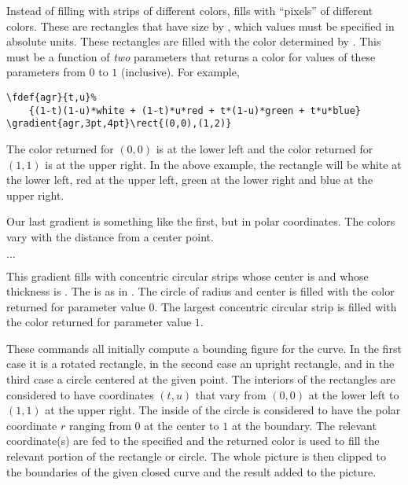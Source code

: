 \documentclass[letterpaper]{article}
\begin{document}
Instead of filling with strips of different colors, 
fills with ``pixels'' of different colors. These are rectangles that
have size  by , which values must be specified
in absolute units. These rectangles are filled with the color determined
by . This must be a function of \emph{two} parameters that
returns a color for values of these parameters from $0$ to $1$
(inclusive). For example,
\begin{verbatim}
\fdef{agr}{t,u}%
    {(1-t)(1-u)*white + (1-t)*u*red + t*(1-u)*green + t*u*blue}
\gradient{agr,3pt,4pt}\rect{(0,0),(1,2)}
\end{verbatim}
The color returned for $(0,0)$ is at the lower left and the color
returned for $(1,1)$ is at the upper right. In the above example, the
rectangle will be white at the lower left, red at the upper left, green
at the lower right and blue at the upper right.

Our last gradient is something like the first, but in polar coordinates.
The colors vary with the distance from a center point.

\begin{cd}
$\ldots$%
%
\end{cd}

This gradient fills with concentric circular strips whose center is
 and whose thickness is . The  is
as in . The circle of radius  and center
 is filled with the color returned for parameter value $0$.
The largest concentric circular strip is filled with the color returned
for parameter value $1$.

These commands all initially compute a bounding figure for the curve. In
the first case it is a rotated rectangle, in the second case an upright
rectangle, and in the third case a circle centered at the given point.
The interiors of the rectangles are considered to have coordinates
$(t,u)$ that vary from $(0,0)$ at the lower left to $(1,1)$ at the upper
right. The inside of the circle is considered to have the polar
coordinate $r$ ranging from $0$ at the center to $1$ at the boundary.
The relevant coordinate(s) are fed to the specified  and
the returned color is used to fill the relevant portion of the rectangle
or circle. The whole picture is then clipped to the boundaries of the
given closed curve and the result added to the picture.
\end{document}
